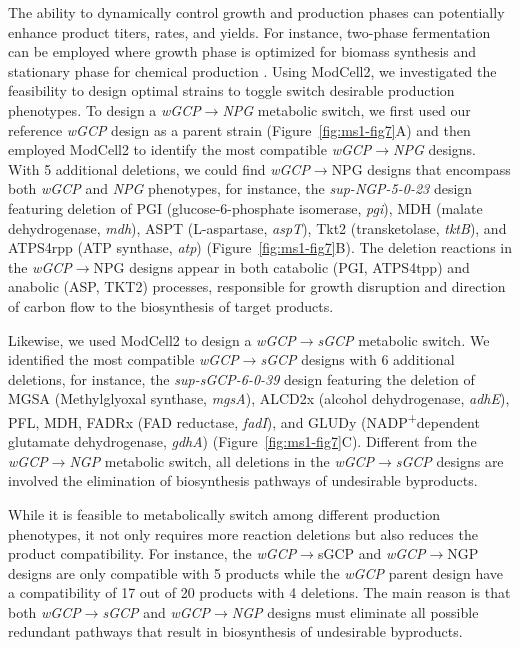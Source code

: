 The ability to dynamically control growth and production phases can potentially enhance product titers, rates, and yields.
For instance, two-phase fermentation can be employed where growth phase is optimized for biomass synthesis and stationary phase for chemical production \citep{klamt2018}.
Using ModCell2, we investigated the feasibility to design optimal strains to toggle switch desirable production phenotypes\emph{.}
To design a \emph{wGCP}$\rightarrow$\emph{NPG} metabolic switch, we first used our reference \emph{wGCP} design as a parent strain (Figure~\ref{fig:ms1-fig7}A) and then employed ModCell2 to identify the most compatible \emph{wGCP}$\rightarrow$\emph{NPG} designs.
With 5 additional deletions, we could find \emph{wGCP}$\rightarrow$NPG designs that encompass both \emph{wGCP} and \emph{NPG} phenotypes, for instance, the \emph{sup-NGP-5-0-23} design featuring deletion of PGI (glucose-6-phosphate isomerase, \emph{pgi}), MDH (malate dehydrogenase, \emph{mdh}), ASPT (L-aspartase, \emph{aspT}), Tkt2 (transketolase, \emph{tktB}), and ATPS4rpp (ATP synthase, \emph{atp}) (Figure~\ref{fig:ms1-fig7}B).
The deletion reactions in the \emph{wGCP}$\rightarrow$NPG designs appear in both catabolic (PGI, ATPS4tpp) and anabolic (ASP, TKT2) processes, responsible for growth disruption and direction of carbon flow to the biosynthesis of target products.

Likewise, we used ModCell2 to design a \emph{wGCP}$\rightarrow$\emph{sGCP} metabolic switch\emph{.} We identified the most compatible \emph{wGCP}$\rightarrow$\emph{sGCP} designs with 6 additional deletions, for instance, the \emph{sup-sGCP-6-0-39} design featuring the deletion of MGSA (Methylglyoxal synthase, \emph{mgsA}), ALCD2x (alcohol dehydrogenase, \emph{adhE}), PFL, MDH, FADRx (FAD reductase, \emph{fadI}), and GLUDy (NADP\textsuperscript{+}dependent glutamate dehydrogenase, \emph{gdhA}) (Figure~\ref{fig:ms1-fig7}C).
Different from the \emph{wGCP}$\rightarrow$\emph{NGP} metabolic switch, all deletions in the \emph{wGCP}$\rightarrow$\emph{sGCP} designs are involved the elimination of biosynthesis pathways of undesirable byproducts.

While it is feasible to metabolically switch among different production phenotypes, it not only requires more reaction deletions but also reduces the product compatibility.
For instance, the \emph{wGCP}$\rightarrow$sGCP and \emph{wGCP}$\rightarrow$NGP designs are only compatible with 5 products while the \emph{wGCP} parent design have a compatibility of 17 out of 20 products with 4 deletions.
The main reason is that both \emph{wGCP}$\rightarrow$\emph{sGCP} and \emph{wGCP}$\rightarrow$\emph{NGP} designs must eliminate all possible redundant pathways that result in biosynthesis of undesirable byproducts.

